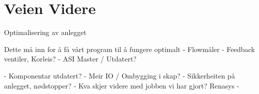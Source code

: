\section{Veien Videre}
\thispagestyle{fancy}

Optimalisering av anlegget

Dette må inn for å få vårt program til å fungere optimalt
- Flowmåler
- Feedback ventiler, Korleis?
- ASI Master / Utdatert?


- Komponentar utdatert? 
- Meir IO / Ombygging i skap?
- Sikkerheiten på anlegget, nødstopper? 
- Kva skjer videre med jobben vi har gjort? Renasys
- 